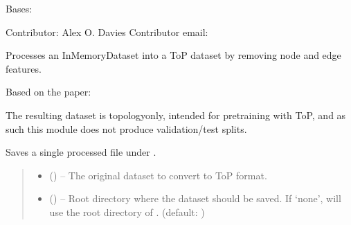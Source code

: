 \documentclass[letterpaper,10pt,english]{sphinxhowto}
\begin{document}
\begin{fulllineitems}
\label{\detokenize{top:top.ToPDataset}}
\pysigstartsignatures
{}
\pysigstopsignatures
\sphinxAtStartPar
Bases: 

\sphinxAtStartPar
Contributor: Alex O. Davies
Contributor email: 

\sphinxAtStartPar
Processes an InMemoryDataset into a ToP dataset by removing node and edge features.

\sphinxAtStartPar
Based on the paper:
\begin{quote}

\sphinxAtStartPar
{}
\end{quote}

\sphinxAtStartPar
The resulting dataset is topology\sphinxhyphen{}only, intended for pre\sphinxhyphen{}training with ToP, and as such this module does not produce validation/test splits.

\sphinxAtStartPar
Saves a single processed file  under .
\begin{quote}\begin{description}
\begin{itemize}
\item {} 
\sphinxAtStartPar
{} () – The original dataset to convert to ToP format.

\item {} 
\sphinxAtStartPar
{} () – Root directory where the dataset should be saved. If ‘none’, will use the root directory of . (default: )


\end{itemize}
\end{description}
\end{quote}
\end{fulllineitems}
\end{document}
